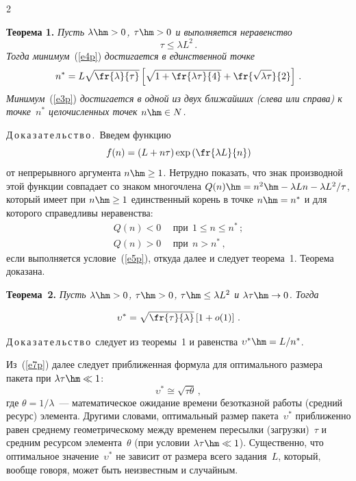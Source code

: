 \begin{multicols}{2}
     \medskip
     
     \noindent
     \textbf{Теорема 1.} \textit{Пусть $\lambda\hm>0$, $\tau\hm>0$ и 
выполняется неравенство}
     \begin{equation}
     \tau\leq \lambda L^2\,.
     \label{e5p}
     \end{equation}
\textit{Тогда минимум}~(\ref{e4p}) \textit{достигается в единственной \mbox{точке}}
$$
n^*=L\sqrt{\fr{\lambda}{\tau}}\left[  
\sqrt{1+\fr{\lambda\tau}{4}}+\fr{\sqrt{\lambda\tau}}{2}\right]\,.
$$
\textit{Минимум}~(\ref{e3p}) \textit{достигается в одной из двух ближайших 
(слева или справа) к точке~$n^*$ целочисленных точек $n\hm\in N$.} 

     \smallskip
     
     \noindent
     Д\,о\,к\,а\,з\,а\,т\,е\,л\,ь\,с\,т\,в\,о\,.\ Введем функцию
     \begin{equation}
     f(n) =\left( L+n\tau\right) \exp\left( \fr{\lambda L}{n}\right)
     \label{e6p}
     \end{equation}
от непрерывного аргумента $n\hm\geq 1$. Нетрудно показать, что знак 
производной этой функции совпадает со знаком многочлена 
$Q(n)\hm=n^2\hm-\lambda L n -\lambda L^2/\tau$, который имеет при 
$n\hm\geq 1$ единственный корень в точке $n\hm=n^*$ и для которого 
справедливы неравенства:
\begin{align*}
Q(n)<0 &\ \ \mbox{при}\ \ 1\leq n\leq n^*\,;\\
Q(n)>0 &\  \ \mbox{при}\ \ n>n^*\,,
\end{align*}
если выполняется условие~(\ref{e5p}), откуда далее и следует теорема~1. 
Теорема доказана.

\smallskip

     \noindent
     \textbf{Теорема~2.} \textit{Пусть $\lambda\hm>0$, $\tau\hm>0$, 
$\tau\hm\leq \lambda L^2$ и $\lambda\tau\hm\rightarrow 0$. Тогда} 

\noindent
     \begin{equation}
     \upsilon^*=\sqrt{\fr{\tau}{\lambda}}\left[ 1+o(1)\right]\,.
     \label{e7p}
     \end{equation}
     
     \smallskip
     
     \noindent
     Д\,о\,к\,а\,з\,а\,т\,е\,л\,ь\,с\,т\,в\,о\ следует из теоремы~1 и равенства 
$\upsilon^*\hm=L/n^*$. 
     
     \medskip
     
     Из~(\ref{e7p}) далее следует приближенная формула для оптимального 
размера пакета при $\lambda\tau\hm\ll 1$:
     $$
     \upsilon^*\cong \sqrt{\tau\theta}\,,
     $$
где $\theta=1/\lambda$~--- математическое ожидание \mbox{времени} безотказной 
работы (средний ресурс) элемента. Другими словами, оптимальный размер 
пакета~$\upsilon^*$ приближенно равен среднему геометрическому между 
временем пересылки (загрузки)~$\tau$ и средним ресурсом элемента~$\theta$ 
(при условии $\lambda\tau\hm\ll 1$). Существенно, что оптимальное 
значение~$\upsilon^*$ не зависит от размера всего задания~$L$, который, 
вообще говоря, может быть неизвестным и случайным.
     

\end{multicols}
